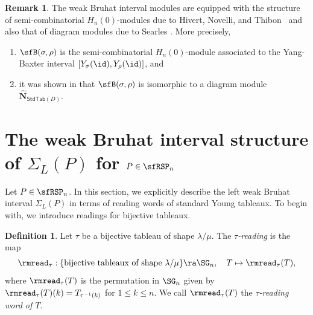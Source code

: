 \documentclass[12pt, reqno]{amsart}
\theoremstyle{definition}
\newtheorem{definition}[theorem]{Definition}
\newtheorem{remark}[theorem]{Remark}
\numberwithin{equation}{section} \numberwithin{figure}{section}
\numberwithin{table}{section}
\begin{document}
\begin{remark}
The weak Bruhat interval modules are equipped with the structure of semi-combinatorial $H_n(0)$-modules due to Hivert, Novelli, and Thibon~\cite{06HNT} and also that of diagram modules due to Searles \cite{22Searles}. 
More precisely,

\begin{enumerate}[label = {\rm (\arabic*)}]
\item $\sfB(\sigma,\rho)$ is the semi-combinatorial $H_n(0)$-module associated to the Yang-Baxter interval $[Y_{\sigma}(\id), Y_{\rho}(\id)]$, and

\item it was shown in \cite[Subsection 7.3]{22Searles} that $\sfB(\sigma,\rho)$ is isomorphic to a diagram module $\widehat{\mathbf{N}}_{\mathsf{StdTab}(D)}$.
\end{enumerate}

\end{remark}


\section{The weak Bruhat interval structure of $\Sigma_L(P)$ for $P \in \sfRSP_n$}\label{sec: int str for regular Schur}

Let $P \in \sfRSP_n$.
In this section, we explicitly describe the left weak Bruhat interval $\Sigma_L(P)$ in terms of reading words of standard Young tableaux.
To begin with, we introduce readings for bijective tableaux.



\begin{definition}\label{def: read tau}
Let $\tau$ be a bijective tableau of shape $\lambda / \mu$.
The \emph{$\tau$-reading} is the map 
$$
\rmread_\tau: 
\{\text{bijective tableaux of shape $\lambda / \mu$}\} \ra \SG_n, \quad T \mapsto \rmread_\tau(T),
$$ 
where $\rmread_\tau(T)$ is the permutation in $\SG_n$ given by
$\rmread_\tau(T)(k) = T_{\tau^{-1}(k)}$ for $1 \le k \le n$.
We call $\rmread_\tau(T)$ the \emph{$\tau$-reading word of $T$}.
\end{definition}
\end{document}
